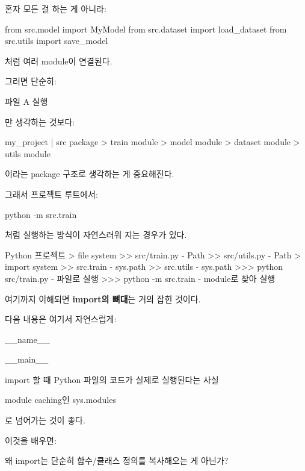  혼자 모든 걸 하는 게 아니라:

\begin{dhkcode}
from src.model import MyModel
from src.dataset import load_dataset
from src.utils import save_model
\end{dhkcode}

처럼 여러 module이 연결된다.

그러면 단순히:

\begin{dhksmry}[centered]
파일 A 실행
\end{dhksmry}

만 생각하는 것보다:

\begin{dhkdir}
my_project
| src package
> train module
> model module
> dataset module
> utils module
\end{dhkdir}

이라는 package 구조로 생각하는 게 중요해진다.

그래서 프로젝트 루트에서:

\begin{dhkzsh}
python -m src.train
\end{dhkzsh}

처럼 실행하는 방식이 자연스러워 지는 경우가 있다.

\begin{dhkdir}
Python 프로젝트
> file system
>> src/train.py - Path
>> src/utils.py - Path
> import system
>> src.train - sys.path
>> src.utils - sys.path
>>> python src/train.py - 파일로 실행
>>> python -m src.train - module로 찾아 실행
\end{dhkdir}

여기까지 이해되면 \textbf{import의 뼈대}는 거의 잡힌 것이다.

다음 내용은 여기서 자연스럽게:

\begin{dhksmry}
    __name__

    __main__

    import 할 때 Python 파일의 코드가 실제로 실행된다는 사실

    module caching인 sys.modules
\end{dhksmry}

로 넘어가는 것이 좋다.

이것을 배우면:
\begin{dhknote}
\begin{dhksmry}[centered]
왜 import는 단순히 함수/클래스 정의를 복사해오는 게 아닌가?
\end{dhksmry}
\end{dhknote}

